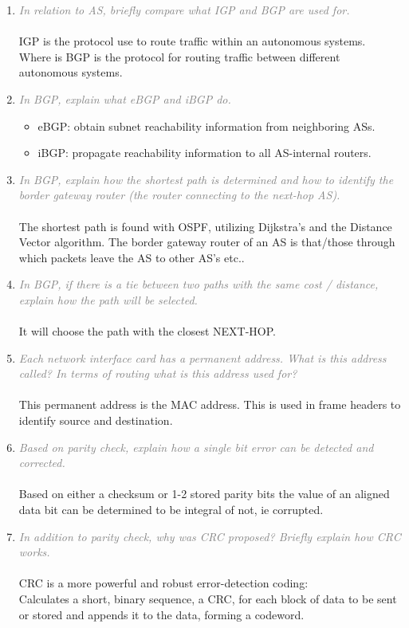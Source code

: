 \documentclass[a4paper,11pt]{article}
\begin{document}
\begin{enumerate}
\item
\textcolor{gray}{\textit{In relation to AS, briefly compare what IGP and BGP are
used for.}}\\ \\
IGP is the protocol use to route traffic within an autonomous systems.\\
Where is BGP is the protocol for routing traffic between different autonomous systems.
\item
\textcolor{gray}{\textit{In BGP, explain what eBGP and iBGP do.}}
\begin{itemize}
	\item eBGP: obtain subnet reachability information from neighboring ASs.
	\item iBGP: propagate reachability information to all AS-internal routers.
\end{itemize}
\item
\textcolor{gray}{\textit{In BGP, explain how the shortest path is determined and
how to identify the border gateway router (the router connecting
to the next-hop AS).}}\\ \\
The shortest path is found with OSPF, utilizing Dijkstra's and the Distance Vector algorithm.
The border gateway router of an AS is that/those through which packets leave the AS to other AS's etc..
\item
\textcolor{gray}{\textit{In BGP, if there is a tie between two paths with the
same cost / distance, explain how the path will be selected.}}\\ \\
It will choose the path with the closest NEXT-HOP.
\item
\textcolor{gray}{\textit{Each network interface card has a permanent address.
What is this address called? In terms of routing what is this
address used for?}}\\ \\
This permanent address is the MAC address. This is used in frame headers to identify source and destination.
\item
\textcolor{gray}{\textit{Based on parity check, explain how a single bit
error can be detected and corrected.}}\\ \\
Based on either a checksum or 1-2 stored parity bits the value of an aligned data bit can be determined to be integral of not, ie corrupted.
\item
\textcolor{gray}{\textit{In addition to parity check, why was CRC proposed?
Briefly explain how CRC works.}}\\ \\
CRC is a more powerful and robust error-detection coding:
\\
Calculates a short, binary sequence, a CRC, for each block of data to be sent or stored and appends it to the data, forming a codeword.


\end{enumerate}
\end{document}
